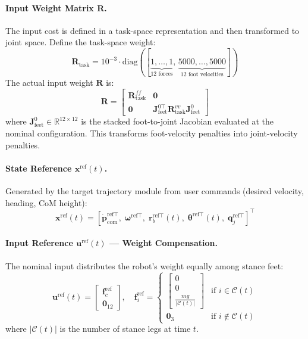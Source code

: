 \documentclass[11pt,a4paper]{article}
\newcommand{\R}{\mathbb{R}}==
\begin{document}
\paragraph{Input Weight Matrix $\bm{R}$.}
The input cost is defined in a task-space representation and then transformed to joint space. Define the task-space weight:
\begin{equation}
	\bm{R}_{\text{task}} = 10^{-3} \cdot \text{diag}([\underbrace{1, \ldots, 1}_{12 \text{ forces}},\,
		\underbrace{5000, \ldots, 5000}_{12 \text{ foot velocities}}])
\end{equation}
The actual input weight $\bm{R}$ is:
\begin{equation}
	\bm{R} = \begin{bmatrix}
		\bm{R}_{\text{task}}^{ff} & \bm{0}                                                                          \\
		\bm{0}                    & \bm{J}_{\text{feet}}^{0\top} \bm{R}_{\text{task}}^{vv} \bm{J}_{\text{feet}}^{0}
	\end{bmatrix}
\end{equation}
where $\bm{J}_{\text{feet}}^{0} \in \R^{12 \times 12}$ is the stacked foot-to-joint Jacobian evaluated at the nominal configuration. This transforms foot-velocity penalties into joint-velocity penalties.

\paragraph{State Reference $\bm{x}^{\text{ref}}(t)$.}
Generated by the target trajectory module from user commands (desired velocity, heading, CoM height):
\begin{equation}
	\bm{x}^{\text{ref}}(t) = [\dot{\bm{p}}_{\text{com}}^{\text{ref}\top},\; \bm{\omega}^{\text{ref}\top},\; \bm{r}_b^{\text{ref}\top}(t),\; \bm{\theta}^{\text{ref}\top}(t),\; \bm{q}_j^{\text{ref}\top}]^\top
\end{equation}

\paragraph{Input Reference $\bm{u}^{\text{ref}}(t)$ --- Weight Compensation.}
The nominal input distributes the robot's weight equally among stance feet:
\begin{equation}
	\bm{u}^{\text{ref}}(t) = \begin{bmatrix} \bm{f}_c^{\text{ref}} \\ \bm{0}_{12} \end{bmatrix}, \quad
	\bm{f}_i^{\text{ref}} = \begin{cases}
		\displaystyle \begin{bmatrix} 0 \\ 0 \\ \frac{mg}{|\mathcal{C}(t)|} \end{bmatrix} & \text{if } i \in \mathcal{C}(t)    \\[8pt]
		\bm{0}_3                                                                                   & \text{if } i \notin \mathcal{C}(t)
	\end{cases}
\end{equation}
where $|\mathcal{C}(t)|$ is the number of stance legs at time $t$.
\end{document}

